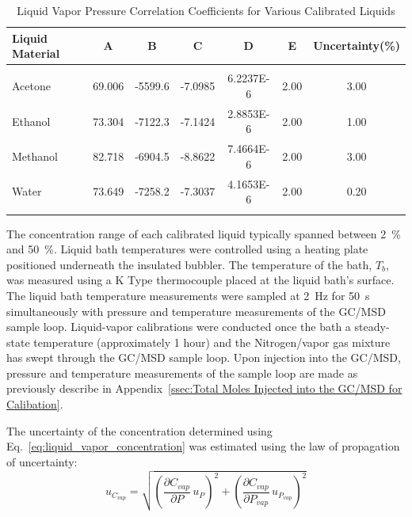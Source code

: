 \documentclass[12pt]{article}
\begin{document}
\begin{table}[!]
\caption{Liquid Vapor Pressure Correlation Coefficients for Various Calibrated Liquids}
\label{tab:Liquid Calibrate_Table}
\centering
	\footnotesize
	\begin{tabular}{lcccccc}
			\hline
\textbf{Liquid Material} &\textbf{A}& \textbf{B}& \textbf{C}&\textbf{D}&\textbf{E}&\textbf{Uncertainty(\%)}\\
\hline
\\[0.001cm]
Acetone	&	69.006	&	-5599.6	&	-7.0985	&	6.2237E-6	& 	2.00	&  3.00\\
Ethanol	&	73.304	&	-7122.3	&	-7.1424	&	2.8853E-6	& 	2.00	&  1.00\\
Methanol	&	82.718	&	-6904.5	&	-8.8622	&	7.4664E-6	& 	2.00	&  3.00\\
Water		&	73.649	&	-7258.2	&	-7.3037	&	4.1653E-6	& 	2.00	&  0.20\\
\\[0.01cm]
\hline
\end{tabular}
\end{table}

The concentration range of each calibrated liquid typically spanned between 2~\% and 50~\%. Liquid bath temperatures were controlled using a heating plate positioned underneath the insulated bubbler. The temperature of the bath, $T_{b}$, was measured using a K Type thermocouple placed at the liquid bath's surface. The liquid bath temperature measurements were sampled at 2~\si{Hz} for 50~\si{s} simultaneously with pressure and temperature measurements of the GC/MSD sample loop. Liquid-vapor calibrations were conducted once the bath a steady-state temperature (approximately 1 hour) and the Nitrogen/vapor gas mixture has swept through the GC/MSD sample loop. Upon injection into the GC/MSD, pressure and temperature measurements of the sample loop are made as previously describe in Appendix~\ref{ssec:Total Moles Injected into the GC/MSD for Calibation}.

The uncertainty of the concentration determined using Eq.~\ref{eq:liquid_vapor_concentration} was estimated using the law of propagation of uncertainty:
\begin{equation}
\label{eq:vapor_concentration_uncertainty}
u_{\scriptscriptstyle C_{vap}} = \sqrt{{\left( \frac{\partial C_{vap}}{\partial P}\,u_{\scriptscriptstyle P} \right) }^2+{\left(\frac{\partial C_{vap}}{\partial P_{vap}}\,u_{\scriptscriptstyle P_{vap}}\right)}^2}
\end{equation}
\end{document}
